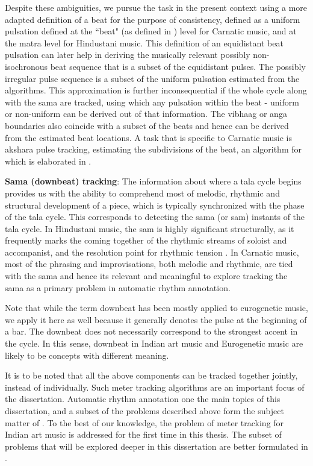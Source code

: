 Despite these ambiguities, we pursue the task in the present context using a more adapted definition of a beat for the purpose of consistency, defined as a uniform pulsation defined at the ``beat" (as defined in ) level for Carnatic music, and at the \gls{matra} level for Hindustani music. This definition of an equidistant beat pulsation can later help in deriving the musically relevant possibly non-isochronous beat sequence that is a subset of the equidistant pulses. The possibly irregular pulse sequence is a subset of the uniform pulsation estimated from the algorithms. This approximation is further inconsequential if the whole cycle along with the \gls{sama} are tracked, using which any pulsation within the beat - uniform or non-uniform can be derived out of that information. The \gls{vibhaag} or \gls{anga} boundaries also coincide with a subset of the beats and hence can be derived from the estimated beat locations. A task that is specific to Carnatic music is \gls{akshara} pulse tracking, estimating the subdivisions of the beat, an algorithm for which is elaborated in . 

\textbf{Sama (downbeat) tracking}: The information about where a \gls{tala} cycle begins provides us with the ability to comprehend most of melodic, rhythmic and structural development of a piece, which is typically synchronized with the phase of the \gls{tala} cycle. This corresponds to detecting the \gls{sama} (or \gls{sam}) instants of the \gls{tala} cycle. In Hindustani music, the \gls{sam} is highly significant structurally, as it frequently marks the coming together of the rhythmic streams of soloist and accompanist, and the resolution point for rhythmic tension \cite[p. 81]{clayton:00:time}. In Carnatic music, most of the phrasing and improvisations, both melodic and rhythmic, are tied with the \gls{sama} and hence its relevant and meaningful to explore tracking the \gls{sama} as a primary problem in automatic rhythm annotation. 

Note that while the term downbeat has been mostly applied to eurogenetic music, we apply it here as well because it generally denotes the pulse at the beginning of a bar. The downbeat does not necessarily correspond to the strongest accent in the cycle. In this sense, downbeat in Indian art music and Eurogenetic music are likely to be concepts with different meaning. 

It is to be noted that all the above components can be tracked together jointly, instead of individually. Such meter tracking algorithms are an important focus of the dissertation. Automatic rhythm annotation one the main topics of this dissertation, and a subset of the problems described above form the subject matter of . To the best of our knowledge, the problem of meter tracking for Indian art music is addressed for the first time in this thesis. The subset of problems that will be explored deeper in this dissertation are better formulated in .
%
